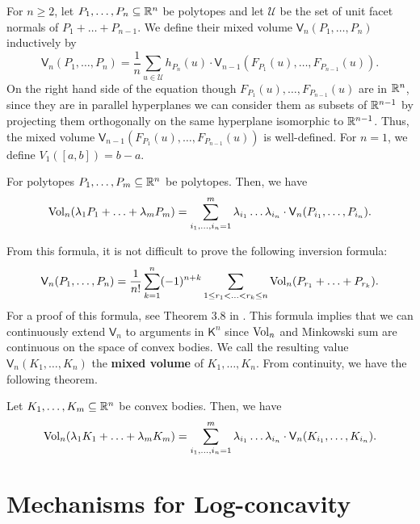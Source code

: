 \documentclass{puthesis-UG}
\begin{document}
\begin{defn}
	For $n \geq 2$, let $P_1, \ldots, P_n \subseteq \mathbb{R}^n$ be polytopes and let $\mathcal{U}$ be the set of unit facet normals of $P_1 + \ldots + P_{n-1}$. We define their mixed volume $\mathsf{V}_n(P_1, \ldots, P_n)$ inductively by 
	\[
		\mathsf{V}_n(P_1, \ldots, P_n) = \frac{1}{n} \sum_{u \in \mathcal{U}} h_{P_n}(u) \cdot \mathsf{V}_{n-1} (F_{P_1}(u), \ldots, F_{P_{n-1}}(u)).
	\]
	On the right hand side of the equation though $F_{P_1}(u), \ldots, F_{P_{n-1}}(u)$ are in $\mathbb{R}^n$, since they are in parallel hyperplanes we can consider them as subsets of $\mathbb{R}^{n-1}$ by projecting them orthogonally on the same hyperplane isomorphic to $\mathbb{R}^{n-1}$. Thus, the mixed volume $\mathsf{V}_{n-1}(F_{P_1}(u), \ldots, F_{P_{n-1}}(u))$ is well-defined. For $n = 1$, we define $V_1 ([a, b]) = b-a$. 
\end{defn}

\begin{thm}
	For polytopes $P_1, \ldots, P_m \subseteq \mathbb{R}^n$ be polytopes. Then, we have 
	\[
		\operatorname{Vol}_n(\lambda_1 P_1 + \ldots + \lambda_m P_m) = \sum_{i_1, \ldots, i_n = 1}^m \lambda_{i_1} \ldots \lambda_{i_n} \cdot \mathsf{V}_n (P_{i_1}, \ldots, P_{i_n}).
	\]
\end{thm}

From this formula, it is not difficult to prove the following inversion formula:
\[
	\mathsf{V}_n(P_1, \ldots, P_n) = \frac{1}{n!} \sum_{k = 1}^n (-1)^{n+k} \sum_{1 \leq r_1 < \ldots < r_k \leq n} \operatorname{Vol}_n (P_{r_1} + \ldots + P_{r_k}).
\]
For a proof of this formula, see Theorem 3.8 in \cite{Hug2020-ue}. This formula implies that we can continuously extend $\mathsf{V}_n$ to arguments in $\mathsf{K}^n$ since $\operatorname{Vol}_n$ and Minkowski sum are continuous on the space of convex bodies. We call the resulting value $\mathsf{V}_n (K_1, \ldots, K_n)$ the \textbf{mixed volume} of $K_1, \ldots, K_n$. From continuity, we have the following theorem. 
\begin{thm}
	Let $K_1, \ldots, K_m \subseteq \mathbb{R}^n$ be convex bodies. Then, we have 
	\[
		\operatorname{Vol}_n (\lambda_1 K_1 + \ldots + \lambda_m K_m) = \sum_{i_1 , \ldots , i_n = 1}^m \lambda_{i_1} \ldots \lambda_{i_n} \cdot \mathsf{V}_n (K_{i_1}, \ldots, K_{i_n}).
	\]
\end{thm}

\chapter{Mechanisms for Log-concavity}
\end{document}
